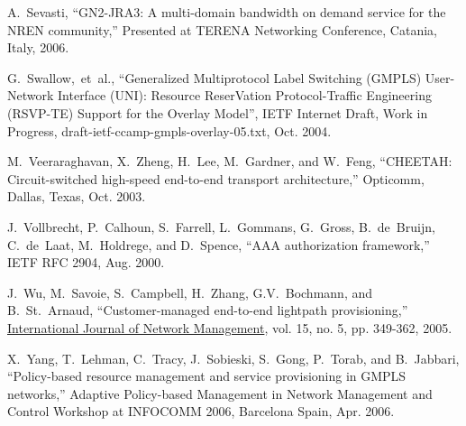 \documentclass[conference]{IEEEtran}
\begin{document}
\begin{thebibliography}{1}
A.~Sevasti,
``GN2-JRA3: A multi-domain bandwidth on demand service for the NREN community,''
Presented at TERENA Networking Conference, Catania, Italy, 2006.

G.~Swallow,~et~al.,
``Generalized Multiprotocol Label Switching (GMPLS) User-Network Interface
(UNI): Resource ReserVation Protocol-Traffic Engineering (RSVP-TE) Support
for the Overlay Model'', IETF Internet Draft, Work in Progress,
draft-ietf-ccamp-gmpls-overlay-05.txt, Oct. 2004.

M.~Veeraraghavan, X.~Zheng, H.~Lee, M.~Gardner, and W.~Feng,
``CHEETAH: Circuit-switched high-speed end-to-end transport architecture,''
Opticomm, Dallas, Texas, Oct. 2003.

J.~Vollbrecht, P.~Calhoun, S.~Farrell, L.~Gommans, G.~Gross, B.~de~Bruijn,
C.~de~Laat, M.~Holdrege, and D.~Spence,
``AAA authorization framework,'' IETF RFC 2904, Aug. 2000.

J.~Wu, M.~Savoie, S.~Campbell, H.~Zhang, G.V.~Bochmann, and B.~St.~Arnaud,
``Customer-managed end-to-end lightpath provisioning,''
\underline{International Journal of Network Management},
vol. 15, no. 5, pp. 349-362, 2005.

X.~Yang, T.~Lehman, C.~Tracy, J.~Sobieski, S.~Gong, P.~Torab, and B.~Jabbari,
``Policy-based resource management and service provisioning in GMPLS networks,''
Adaptive Policy-based Management in Network Management and Control Workshop
at INFOCOMM 2006, Barcelona Spain, Apr. 2006.

\end{thebibliography}
\end{document}
